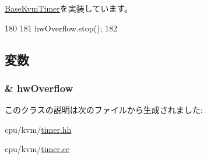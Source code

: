 \hyperlink{classBaseKvmTimer_aaef5c4bcad609bff2d6580c368020346}{BaseKvmTimer}を実装しています。


\begin{DoxyCode}
180 {
181     hwOverflow.stop();
182 }
\end{DoxyCode}


\subsection{変数}
\hypertarget{classPerfKvmTimer_af183dc3e77e7fc3603a0d4ff4a8fb65d}{
\subsubsection[{hwOverflow}]{\& {\bf hwOverflow}}}
\label{classPerfKvmTimer_af183dc3e77e7fc3603a0d4ff4a8fb65d}


このクラスの説明は次のファイルから生成されました:\begin{DoxyCompactItemize}
\item 
cpu/kvm/\hyperlink{timer_8hh}{timer.hh}\item 
cpu/kvm/\hyperlink{timer_8cc}{timer.cc}\end{DoxyCompactItemize}
